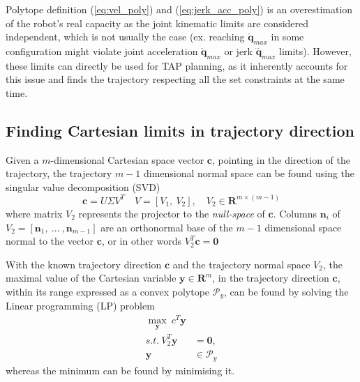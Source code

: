 Polytope definition (\ref{eq:vel_poly}) and (\ref{eq:jerk_acc_poly}) is an overestimation of the robot's real capacity as the joint kinematic limits are considered independent, which is not usually the case (ex. reaching $\dot{\bm{q}}_{max}$ in some configuration might violate joint acceleration $\ddot{\bm{q}}_{max}$  or jerk $\dddot{\bm{q}}_{max}$ limits). However, these limits can directly be used for TAP planning, as it inherently accounts for this issue and finds the trajectory respecting all the set constraints at the same time. 

\subsection{Finding Cartesian limits in trajectory direction}
\label{ch:capacity_lp}

Given a $m$-dimensional Cartesian space vector $\bm{c}$, pointing in the direction of the trajectory, the trajectory $m\!-\!1$ dimensional normal space can be found using the singular value decomposition (SVD)
\begin{equation}
    \bm{c} = U\Sigma V^T \quad V = \left[ V_1, ~ V_2\right], \quad V_2 \in \mathbf{R}^{m \times (m-1)}  
\end{equation}
where matrix $V_2$ represents the projector to the \textit{null-space} of $\bm{c}$\cite{klema_singular_1980}. Columns $\bm{n}_i$ of $V_2=\left[\bm{n}_1,~ \ldots~, \bm{n}_{m-1} \right]$ are an orthonormal base of the $m\!-\!1$ dimensional space normal to the vector $\bm{c}$, or in other words $V_2^T\bm{c} = \bm{0}$

With the known trajectory direction $\bm{c}$ and the trajectory normal space $V_2$, the maximal value of the Cartesian variable $\bm{y} \in\mathbf{R}^m$, in the trajectory direction $\bm{c}$, within its range expressed as a convex polytope $\mathcal{P}_y$, can be found by solving the Linear programming (LP) problem\cite{vajda_gass_1964}
\begin{equation}
\begin{split}
    \max_{\bm{y}} ~c^T \bm{y}& \\
    s.t. ~ V_2^T\bm{y} &= \bm{0}, \\
    \bm{y}&\in \mathcal{P}_y
\end{split}\label{eq:lp_general}
\end{equation}
whereas the minimum can be found by minimising it\cite{Skuric2022}.

